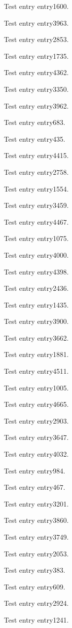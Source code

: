 Test entry \gls{entry1600}.

Test entry \gls{entry3963}.

Test entry \gls{entry2853}.

Test entry \gls{entry1735}.

Test entry \gls{entry4362}.

Test entry \gls{entry3350}.

Test entry \gls{entry3962}.

Test entry \gls{entry683}.

Test entry \gls{entry435}.

Test entry \gls{entry4415}.

Test entry \gls{entry2758}.

Test entry \gls{entry1554}.

Test entry \gls{entry3459}.

Test entry \gls{entry4467}.

Test entry \gls{entry1075}.

Test entry \gls{entry4000}.

Test entry \gls{entry4398}.

Test entry \gls{entry2436}.

Test entry \gls{entry1435}.

Test entry \gls{entry3900}.

Test entry \gls{entry3662}.

Test entry \gls{entry1881}.

Test entry \gls{entry4511}.

Test entry \gls{entry1005}.

Test entry \gls{entry4665}.

Test entry \gls{entry2903}.

Test entry \gls{entry3647}.

Test entry \gls{entry4032}.

Test entry \gls{entry984}.

Test entry \gls{entry467}.

Test entry \gls{entry3201}.

Test entry \gls{entry3860}.

Test entry \gls{entry3749}.

Test entry \gls{entry2053}.

Test entry \gls{entry383}.

Test entry \gls{entry609}.

Test entry \gls{entry2924}.

Test entry \gls{entry1241}.

